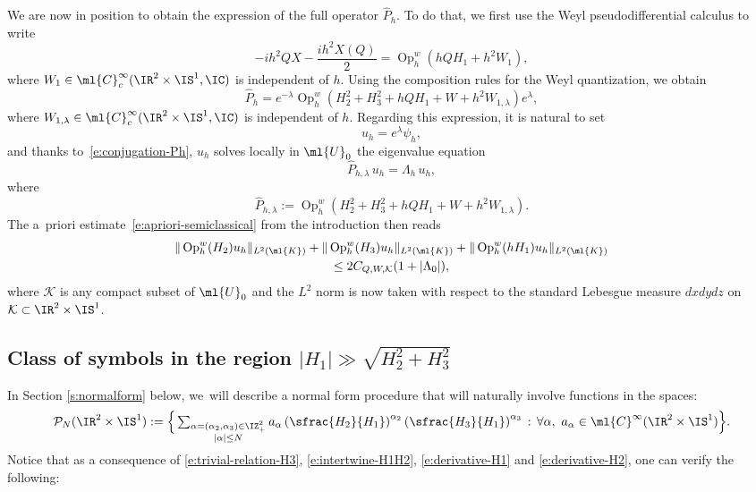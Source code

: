\documentclass[10pt]{amsart}
\theoremstyle{plain}
\theoremstyle{definition}
\theoremstyle{remark}
\newcommand{\Op}{\operatorname{Op}}
\begin{document}
We are now in position to obtain the expression of the full operator $\widehat{P}_h$. To do that, we first use the Weyl pseudodifferential calculus to write
\[
-ih^2QX -\frac{ih^2X(Q)}{2}=\Op_h^w(hQH_1+h^2W_1),
\]
where $W_1\in\ml{C}^{\infty}_c(\IR^2\times\IS^1,\IC)$ is independent of $h$. Using the composition rules for the Weyl quantization, we obtain
\begin{equation}\label{e:conjugation-Ph}
\widehat{P}_h= e^{-\lambda}\Op_h^w(H_2^2+H_3^2+hQH_1+W+h^2W_{1,\lambda}) e^{\lambda},
\end{equation}
where $W_{1,\lambda}\in\ml{C}^{\infty}_c(\IR^2\times\IS^1,\IC)$ is independent of $h$. Regarding this expression, it is natural to set
\begin{equation}\label{e:conjugated-eigenfunction}
u_h=e^{\lambda}\psi_h,
\end{equation}
and thanks to~\eqref{e:conjugation-Ph}, $u_h$ solves locally in $\ml{U}_0$ the eigenvalue equation
\begin{equation}\label{e:eigenvalue-conjugation}
\widehat{P}_{h,\lambda} \, u_h=\Lambda_h \, u_h,
\end{equation}
where
\[
\widehat{P}_{h,\lambda}:=\Op_h^w(H_2^2+H_3^2+hQH_1+W+h^2W_{1,\lambda}).
\]
The a~priori estimate~\eqref{e:apriori-semiclassical} from the introduction then reads
\begin{multline}\label{e:apriori-semiclassical1}
\|\Op_h^w(H_2)u_h\|_{L^2(\ml{K})}+\|\Op_h^w(H_3)u_h\|_{L^2(\ml{K})}+\|\Op_h^w(hH_1)u_h\|_{L^2(\ml{K})}\\
\leq 2C_{Q,W,\mathcal{K}}(1+|\Lambda_0|),
\end{multline}
where $\mathcal{K}$ is any compact subset of $\ml{U}_0$ and the $L^2$ norm is now taken with respect to the standard Lebesgue measure $dxdydz$ on $\mathcal{K}\subset \IR^2\times\IS^1$.

\subsection{Class of symbols in the region $|H_1|\gg\sqrt{H_2^2+H_3^2}$}\label{ss:polynomialsymbols}

In Section \ref{s:normalform} below, we~will describe a normal form procedure that will naturally involve functions in the spaces:
\[\textstyle
\mathcal{P}_N(\IR^2\times\IS^1):=\Big \{\sum_{\substack{\alpha=(\alpha_2,\alpha_3)\in\IZ_+^2 \\ |\alpha|\leq N}} a_{\alpha}\left(\sfrac{H_2}{H_1}\right)^{\alpha_2}\left(\sfrac{H_3}{H_1}\right)^{\alpha_3} \, : \,\forall\alpha,\ a_\alpha\in\ml{C}^{\infty}(\IR^2\times\IS^1)\Big \}.
\]
Notice that as a consequence of \eqref{e:trivial-relation-H3}, \eqref{e:intertwine-H1H2}, \eqref{e:derivative-H1} and \eqref{e:derivative-H2}, one can verify the following:
\end{document}
